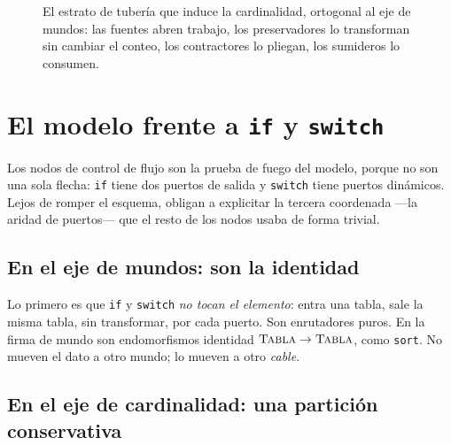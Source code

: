 \documentclass[11pt,a4paper]{article}
\theoremstyle{definition}
\theoremstyle{plain}
\newcommand{\mundo}[1]{\textsc{#1}}   %
\begin{document}
\begin{figure}[h]
\centering
{}
\caption{El estrato de tubería que induce la cardinalidad, ortogonal al eje de
mundos: las fuentes abren trabajo, los preservadores lo transforman sin cambiar el
conteo, los contractores lo pliegan, los sumideros lo consumen.}
\label{fig:stratum}
\end{figure}

\section{El modelo frente a \texttt{if} y \texttt{switch}}

Los nodos de control de flujo son la prueba de fuego del modelo, porque no son una
sola flecha: \texttt{if} tiene dos puertos de salida y \texttt{switch} tiene puertos
dinámicos. Lejos de romper el esquema, obligan a explicitar la tercera coordenada
---la aridad de puertos--- que el resto de los nodos usaba de forma trivial.

\subsection{En el eje de mundos: son la identidad}

Lo primero es que \texttt{if} y \texttt{switch} \emph{no tocan el elemento}: entra
una tabla, sale la misma tabla, sin transformar, por cada puerto. Son enrutadores
puros. En la firma de mundo son endomorfismos identidad
$\mundo{Tabla}\to\mundo{Tabla}$, como \texttt{sort}. No mueven el dato a otro mundo;
lo mueven a otro \emph{cable}.

\subsection{En el eje de cardinalidad: una partición conservativa}
\end{document}
